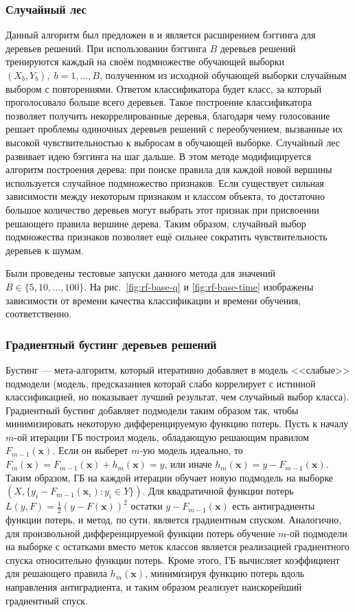 \subsubsection{Случайный лес}
Данный алгоритм был предложен в \cite{ho} и является расширением бэггинга для деревьев решений. При использовании бэггинга \(B\) деревьев решений тренируются каждый на своём подмножестве обучающей выборки \(\left(X_b, Y_b\right),\;b=1,\dotsc,B\), полученном из исходной обучающей выборки случайным выбором с повторениями. Ответом классификатора будет класс, за который проголосовало больше всего деревьев. Такое построение классификатора позволяет получить некоррелированные деревья, благодаря чему голосование решает проблемы одиночных деревьев решений с переобучением, вызванные их высокой чувствительностью к выбросам в обучающей выборке. Случайный лес развивает идею бэггинга на шаг дальше. В этом методе модифицируется алгоритм построения дерева: при поиске правила для каждой новой вершины используется случайное подмножество признаков. Если существует сильная зависимости между некоторым признаком и классом объекта, то достаточно большое количество деревьев могут выбрать этот признак при присвоении решающего правила вершине дерева. Таким образом, случайный выбор подмножества признаков позволяет ещё сильнее сократить чувствительность деревьев к шумам.

Были проведены тестовые запуски данного метода для значений \(B\in\{5,10,\dotsc,100\}\). На рис.~\ref{fig:rf-base-q} и \ref{fig:rf-base-time} изображены зависимости от времени качества классификации и времени обучения, соответственно.

\subsubsection{Градиентный бустинг деревьев решений}
Бустинг --- мета-алгоритм, который итеративно добавляет в модель <<слабые>> подмодели (модель, предсказаниея которай слабо коррелирует с истинной классификацией, но показывает лучший результат, чем случайный выбор класса). Градиентный бустинг \cite{friedman} добавляет подмодели таким образом так, чтобы минимизировать некоторую дифференцируемую функцию потерь. Пусть к началу \(m\)-ой итерации ГБ построил модель, обладающую решающим правилом \(F_{m-1}(\mathbf{x})\). Если он выберет \(m\)-ую модель идеально, то \(F_{m}(\mathbf{x})=F_{m-1}(\mathbf{x}) + h_m(\mathbf{x})=y\), или иначе \(h_m(\mathbf{x})=y-F_{m-1}(\mathbf{x})\). Таким образом, ГБ на каждой итерации обучает новую подмодель на выборке \(\left(X, \{y_i-F_{m-1}(\mathbf{x}_i):y_i\in Y\}\right)\). Для квадратичной функции потерь \(L\left(y, F\right)=\frac12 \left(y-F(\mathbf{x})\right)^2\) остатки \(y-F_{m-1}(\mathbf{x})\) есть антиградиенты функции потерь, и метод, по сути, является градиентным спуском. Аналогично, для произвольной дифференцируемой функции потерь обучение \(m\)-ой подмодели на выборке с остатками вместо меток классов является реализацией градиентного спуска относительно функции потерь. Кроме этого, ГБ вычисляет коэффициент для решающего правила \(h_m(\mathbf{x})\), минимизируя функцию потерь вдоль направления антиградиента, и таким образом реализует наискорейший градиентный спуск.

